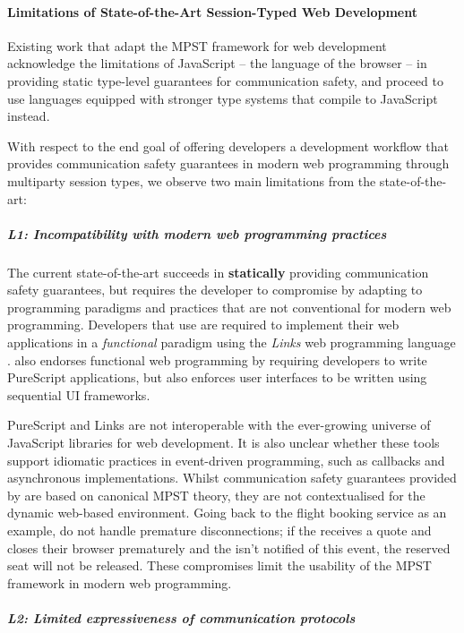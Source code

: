 \paragraph{Limitations of State-of-the-Art Session-Typed Web Development}
Existing work \cite{MVU2020,PureScript2019} that 
adapt the MPST framework for web development
acknowledge the limitations of JavaScript 
-- the language of the browser --
in providing static type-level guarantees
for communication safety, 
and proceed to use
languages equipped with stronger type systems that 
compile to JavaScript instead.

With respect to the end goal of 
offering developers a development workflow
that provides communication safety guarantees in modern
web programming through multiparty session types,
we observe two main limitations from the state-of-the-art:

\subparagraph{L1: 
Incompatibility with modern web programming practices}

The current state-of-the-art succeeds in \textbf{statically}
providing communication safety guarantees,
but requires the developer to compromise by adapting
to programming paradigms and practices that are not
conventional for modern web programming.
Developers that use \cite{MVU2020} are required
to implement their web applications in a \textit{functional} 
paradigm using the \textit{Links} 
web programming language \cite{LINKS}.
\cite{PureScript2019} also endorses
functional web programming by requiring developers to
write PureScript \cite{PureScript} applications, but also
enforces user interfaces to be written using 
sequential UI frameworks.

PureScript and Links are not interoperable
with the ever-growing universe of JavaScript libraries for
web development.
It is also unclear whether these tools support idiomatic
practices in event-driven programming, such as callbacks
and asynchronous implementations.
Whilst communication safety guarantees provided by
\cite{PureScript2019,MVU2020} are based on
canonical MPST theory, they are not contextualised
for the dynamic web-based environment.
Going back to the flight booking service as an example,
\cite{PureScript2019,MVU2020} do not handle premature
disconnections; if the  receives a quote
and closes their browser prematurely and the 
isn't notified of this event, the reserved seat will not be
released.
These compromises limit the usability of the MPST framework
in modern web programming.

\subparagraph{L2: 
Limited expressiveness of communication protocols}


